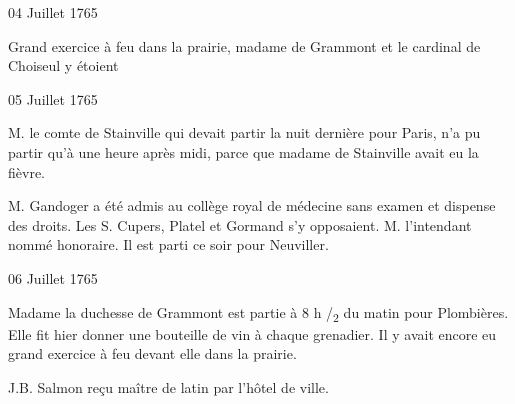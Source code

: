                      \begin{diary}{04 Juillet 1765}{}
                        
                         Grand exercice à feu dans la prairie,
                              madame
                              de Grammont et le cardinal
                              de Choiseul y
                           étoient \bigskip
        
        
                     \end{diary}

                     \begin{diary}{05 Juillet 1765}{}
                        
                        
                           M. le comte de Stainville qui
                           devait partir
                           la nuit dernière pour Paris,
                           n'a pu partir
                           qu'à une heure après midi, parce que madame
                              de Stainville avait eu la fièvre. \bigskip
        
        
                        
                           M. Gandoger a été admis au collège royal
                              de médecine sans examen et dispense des
                           droits. Les S.
                           Cupers, Platel et Gormand
                           s'y opposaient. M. l'intendant nommé
                           honoraire. Il est parti ce soir pour Neuviller. \bigskip
        
        
                     \end{diary}

                     \begin{diary}{06 Juillet 1765}{}
                        
                        
                           Madame la duchesse de Grammont est partie
                           à 8 h /\textsubscript{2} du matin pour
                              Plombières.
                           Elle fit hier donner une bouteille de vin
                           à chaque grenadier. Il y avait encore
                           eu grand exercice à feu devant elle
                           dans la prairie. \bigskip
        
        
                        
                           J.B. Salmon reçu maître de latin par
                           l'hôtel de ville. \bigskip
        
        
                     \end{diary}


